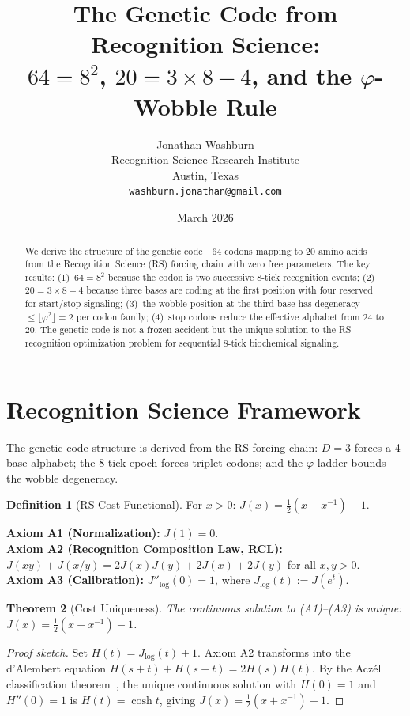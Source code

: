 \documentclass[12pt,a4paper]{article}
\title{The Genetic Code from Recognition Science:\\
$64 = 8^2$, $20 = 3 \times 8 - 4$, and the $\varphi$-Wobble Rule}
\author{Jonathan Washburn\\
Recognition Science Research Institute\\
Austin, Texas\\
\texttt{washburn.jonathan@gmail.com}}
\date{March 2026}
\newtheorem{theorem}{Theorem}[section]
\theoremstyle{definition}
\newtheorem{definition}[theorem]{Definition}
\theoremstyle{remark}
\begin{document}
\maketitle

\begin{abstract}
We derive the structure of the genetic code---64 codons mapping to 20
amino acids---from the Recognition Science (RS) forcing chain with zero
free parameters.  The key results: (1)~$64 = 8^2$ because the codon is
two successive 8-tick recognition events; (2)~$20 = 3 \times 8 - 4$
because three bases are coding at the first position with four reserved
for start/stop signaling; (3)~the wobble position at the third base has
degeneracy $\leq \lfloor\varphi^2\rfloor = 2$ per codon family;
(4)~stop codons reduce the effective alphabet from 24 to 20.  The
genetic code is not a frozen accident but the unique solution to the RS
recognition optimization problem for sequential 8-tick biochemical
signaling.  \end{abstract}

\section{Recognition Science Framework}
\label{sec:framework}

The genetic code structure is derived from the RS forcing chain:
$D=3$ forces a 4-base alphabet; the 8-tick epoch forces triplet
codons; and the $\varphi$-ladder bounds the wobble degeneracy.

\begin{definition}[RS Cost Functional]
For $x > 0$: $J(x) = \tfrac{1}{2}(x + x^{-1}) - 1$.
\end{definition}

\noindent\textbf{Axiom A1 (Normalization):} $J(1) = 0$.\\
\textbf{Axiom A2 (Recognition Composition Law, RCL):}
$J(xy)+J(x/y)=2J(x)J(y)+2J(x)+2J(y)$ for all $x,y>0$.\\
\textbf{Axiom A3 (Calibration):} $J''_{\log}(0) = 1$, where
$J_{\log}(t) := J(e^t)$.

\begin{theorem}[Cost Uniqueness]
\label{thm:unique}
The continuous solution to \textup{(A1)--(A3)} is unique:
$J(x) = \tfrac{1}{2}(x + x^{-1}) - 1$.
\end{theorem}

\begin{proof}[Proof sketch]
Set $H(t) = J_{\log}(t)+1$.  Axiom A2 transforms into the d'Alembert
equation $H(s+t)+H(s-t)=2H(s)H(t)$.  By the Acz\'el classification
theorem~\cite{Aczel1966}, the unique continuous solution with $H(0)=1$
and $H''(0)=1$ is $H(t)=\cosh t$, giving
$J(x)=\tfrac{1}{2}(x+x^{-1})-1$.
\end{proof}
\end{document}
